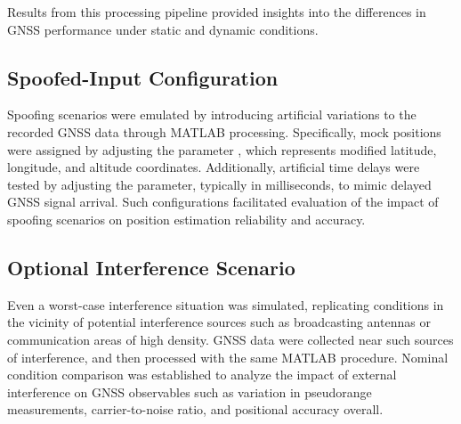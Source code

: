         Results from this processing pipeline provided insights into the differences in GNSS performance under static and dynamic conditions.
    
    \subsection{Spoofed-Input Configuration}

    Spoofing scenarios were emulated by introducing artificial variations to the recorded GNSS data through MATLAB processing. Specifically, mock positions were assigned by adjusting the parameter , which represents modified latitude, longitude, and altitude coordinates. Additionally, artificial time delays were tested by adjusting the  parameter, typically in milliseconds, to mimic delayed GNSS signal arrival. Such configurations facilitated evaluation of the impact of spoofing scenarios on position estimation reliability and accuracy.

    \subsection{Optional Interference Scenario}
    
    Even a worst-case interference situation was simulated, replicating conditions in the vicinity of potential interference sources such as broadcasting antennas or communication areas of high density. GNSS data were collected near such sources of interference, and then processed with the same MATLAB procedure. Nominal condition comparison was established to analyze the impact of external interference on GNSS observables such as variation in pseudorange measurements, carrier-to-noise ratio, and positional accuracy overall.